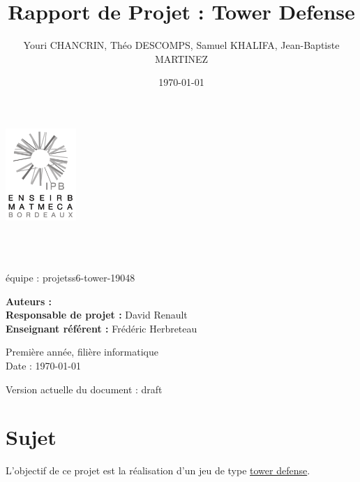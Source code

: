 \documentclass{article}
\title{Rapport de Projet : Tower Defense}
\author{Youri CHANCRIN, Théo DESCOMPS, Samuel KHALIFA, Jean-Baptiste MARTINEZ}
\date{\today}
\makeatletter
\let\mytitle\@title
\let\myauthor\@author
\makeatother
\begin{document}
\begin{flushleft}

\thispagestyle{empty}
\includegraphics[width=0.2\textwidth]{enseirb-matmeca}
\graphicspath{{./img/}}


\hrulefill \\[2em]
\begin{center}
\textbf{\Huge \mytitle}\\[0.8em]
{\large équipe : projetss6-tower-19048}
\\[0.8em]
\end{center}
\hrulefill


{\large \textbf{Auteurs :} \myauthor}\\
{\large \textbf{Responsable de projet :} David Renault}\\
{\large \textbf{Enseignant référent :} Frédéric Herbreteau}


\begin{center}
  Première année, filière informatique\\
  Date : \today
\end{center}


\hfill Version actuelle du document : draft

\end{flushleft}

\newpage

\tableofcontents

\newpage

\section{Sujet}
L'objectif de ce projet est la réalisation d'un jeu de type \hyperlink{https://fr.wikipedia.org/wiki/Tower_defense}{tower defense}.
\end{document}
